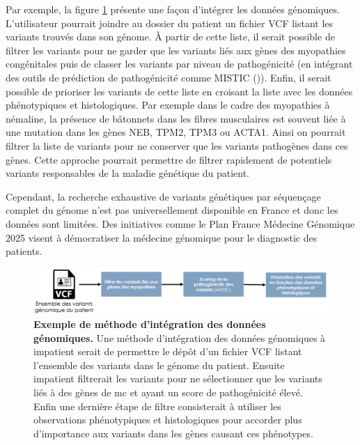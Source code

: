Par exemple, la figure \ref{fig:variant_discuss} présente une façon d'intégrer les données génomiques. L'utilisateur pourrait joindre au dossier du patient un fichier VCF listant les variants trouvés dans son génome. À partir de cette liste, il serait possible de filtrer les variants pour ne garder que les variants liés aux gènes des myopathies congénitales puis de classer les variants par niveau de pathogénicité (en intégrant des outils de prédiction de pathogénicité comme MISTIC (\cite{chennen_mistic_2020})). Enfin, il serait possible de prioriser les variants de cette liste en croisant la liste avec les données phénotypiques et histologiques. Par exemple dans le cadre des myopathies à némaline, la présence de bâtonnets dans les fibres musculaires est souvent liée à une mutation dans les gènes NEB, TPM2, TPM3 ou ACTA1. Ainsi on pourrait filtrer la liste de variants pour ne conserver que les variants pathogènes dans ces gènes. Cette approche pourrait permettre de filtrer rapidement de potentiels variants responsables de la maladie génétique du patient.

Cependant, la recherche exhaustive de variants génétiques par séquençage complet du génome n'est pas universellement disponible en France et donc les données sont limitées. Des initiatives comme le Plan France Médecine Génomique 2025 visent à démocratiser la médecine génomique pour le diagnostic des patients.

\begin{figure}[htbp]
 \centering
 \includegraphics[width=1\textwidth]{figures/variant_discuss.png}
 \caption[Exemple de méthode d'intégration des données génomiques]{\textbf{Exemple de méthode d'intégration des données génomiques.} Une méthode d'intégration des données génomiques à \gls{impatient} serait de permettre le dépôt d'un fichier VCF listant l'ensemble des variants dans le génome du patient. Ensuite \gls{impatient} filtrerait les variants pour ne sélectionner que les variants liés à des gènes de \gls{mc} et ayant un score de pathogénicité élevé. Enfin une dernière étape de filtre consisterait à utiliser les observations phénotypiques et histologiques pour accorder plus d'importance aux variants dans les gènes causant ces phénotypes.}
 \label{fig:variant_discuss}
\end{figure}

